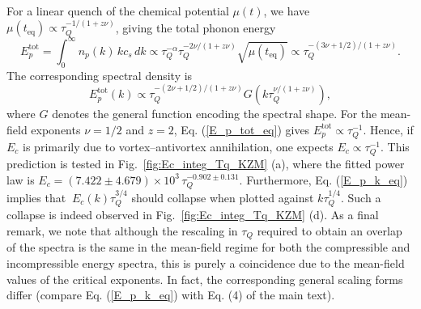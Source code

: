 \documentclass[aps,prl,twocolumn,showpacs,notitlepage,floatfix,superscriptaddress]{revtex4-1}
\begin{document}
For a linear quench of the chemical potential $\mu(t)$, we have $\mu(t_{\textrm{eq}}) \propto \tau_Q^{-1/(1 + z \nu)}$, giving the total phonon energy
\begin{equation}\label{E_p_tot_eq}
E_p^{\mathrm{tot}}
= \int_0^\infty n_p(k)\,
k
c_s
\,dk
\propto
\tau_Q^{-\alpha}
\tau_Q^{-2\nu/(1 + z \nu)}
\sqrt{\mu(t_{\textrm{eq}})}
\propto
\tau_Q^{-(3\nu + 1/2)/(1 + z \nu)}.
\end{equation}
The corresponding spectral density is
\begin{equation}\label{E_p_k_eq}
E^{\textrm{tot}}_p (k)
\propto
\tau_Q^{- \left( 2 \nu + 1 / 2 \right) / \left( 1 + z \nu \right)}
G \left( k \tau_Q^{\nu / \left( 1 + z \nu \right)} \right),
\end{equation}
where $G$ denotes the general function encoding the spectral shape.
For the mean-field exponents $\nu = 1/2$ and $z = 2$, Eq. (\ref{E_p_tot_eq}) gives $E_p^{\mathrm{tot}} \propto \tau_Q^{-1}$.
Hence, if $E_c$ is primarily due to vortex–antivortex annihilation, one expects $E_c \propto \tau_Q^{-1}$.
This prediction is tested in Fig.~\ref{fig:Ec_integ_Tq_KZM} (a), where the fitted power law is
$E_c = (7.422 \pm 4.679)\times 10^3\,\tau_Q^{-0.902 \pm 0.131}$.
Furthermore, Eq. (\ref{E_p_k_eq}) implies that $\ E_c(k)\tau_Q^{3/4}$ should collapse when plotted against $k\tau_Q^{1/4}$. Such a collapse is indeed observed in Fig.~\ref{fig:Ec_integ_Tq_KZM} (d).
As a final remark, we note that although the rescaling in $\tau_{Q}$ required to obtain an overlap of the spectra is the same in the mean-field regime for both the compressible and incompressible energy spectra, this is purely a coincidence due to the mean-field values of the critical exponents. In fact, the corresponding general scaling forms differ (compare Eq. (\ref{E_p_k_eq}) with Eq. (4) of the main text).
\bigskip
\end{document}
